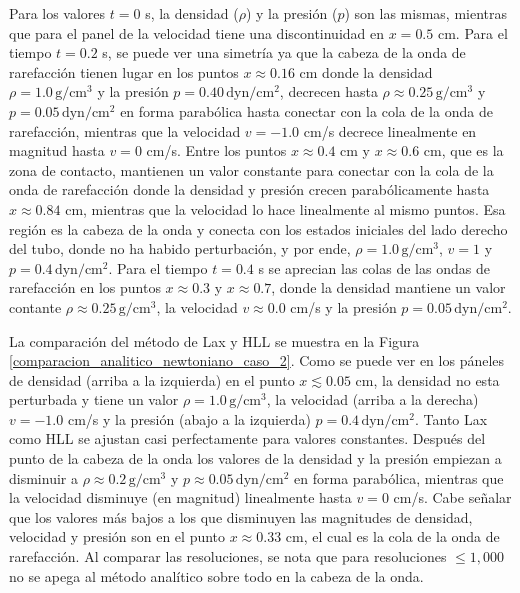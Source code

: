 \documentclass[12pt,a4paper]{book}
\begin{document}
Para los valores $t = 0$ s, la densidad ($\rho$) y la presión ($p$) son las mismas, 
mientras que para el panel de
la velocidad  tiene una discontinuidad en $x = 0.5$ cm. 
Para el tiempo $t = 0.2$ s, se puede ver una 
simetría ya que la cabeza de la onda de rarefacción tienen lugar en los puntos $x \approx 0.16$ cm
donde la densidad $\rho = 1.0 \,  \text{g}/ \text{cm}^3$ y 
la presión $p = 0.40 \,  \text{dyn}/ \text{cm}^2 $,
decrecen hasta $\rho \approx 0.25 \,  \text{g}/ \text{cm}^3$ y $p = 0.05 \,  \text{dyn}/ \text{cm}^2 $ en forma parabólica hasta conectar con la cola de 
la onda de rarefacción, mientras que la velocidad $v = -1.0 $ cm/s decrece linealmente en magnitud 
hasta $v = 0$ cm/s. Entre los puntos $x \approx 0.4$ cm y $x \approx 0.6$ cm, que es la zona de contacto, mantienen
un valor constante para conectar con la cola de la onda de rarefacción donde la densidad y presión 
crecen parabólicamente hasta $x \approx 0.84$ cm, mientras que la velocidad lo hace linealmente al mismo puntos.
Esa región es la cabeza de la onda y conecta con los estados iniciales del lado derecho del tubo, 
donde no ha habido perturbación, y por ende, $\rho = 1.0 \,  \text{g}/ \text{cm}^3$, 
$v = 1$ y $p = 0.4 \,  \text{dyn}/ \text{cm}^2 $.
Para el tiempo $t = 0.4$ s se aprecian las colas de las ondas de rarefacción
en los puntos $x  \approx 0.3$ y $x  \approx 0.7$, donde la densidad mantiene un valor contante 
$\rho \approx 0.25 \,  \text{g}/ \text{cm}^3$, la velocidad $v \approx 0.0$ cm/s y la presión $p = 0.05 \,  \text{dyn}/ \text{cm}^2 $.

La comparación del método de Lax y HLL se muestra en la Figura \ref{comparacion_analitico_newtoniano_caso_2}.
Como se puede ver en los páneles de densidad (arriba a la izquierda) en el punto $x \lesssim  0.05$ cm,
la densidad no esta perturbada y tiene un valor $\rho = 1.0 \,  \text{g}/ \text{cm}^3$,
la velocidad (arriba a la derecha)
$v = -1.0$ cm/s y la presión (abajo a la izquierda) $p = 0.4 \,  \text{dyn}/ \text{cm}^2 $. Tanto Lax como HLL 
se ajustan casi perfectamente 
para valores constantes. Después del punto de la cabeza de la onda los valores de la densidad y 
la presión empiezan a disminuir a $\rho \approx 0.2 \,  \text{g}/ \text{cm}^3$ y 
$p \approx 0.05 \,  \text{dyn}/ \text{cm}^2 $
en forma parabólica, mientras que la velocidad disminuye (en magnitud) linealmente hasta $v = 0$ cm/s.
Cabe señalar que los valores más bajos a los que disminuyen las magnitudes de densidad, velocidad y 
presión son en el punto $x \approx 0.33$ cm, el cual es la cola de la onda de rarefacción. Al comparar
las resoluciones, se nota que para resoluciones $\leq 1,000$ no se apega al método analítico sobre 
todo en la cabeza de la onda.
\end{document}
